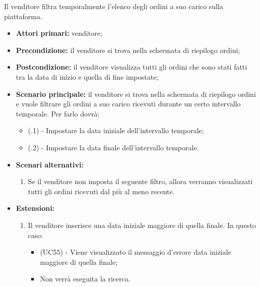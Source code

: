 Il venditore filtra temporalmente l'elenco degli ordini a suo carico sulla piattaforma.
\begin{itemize}
	\item \textbf{Attori primari:} venditore;
	\item \textbf{Precondizione:} il venditore si trova nella schermata di riepilogo ordini;
	\item \textbf{Postcondizione:} il venditore visualizza tutti gli ordini che sono stati fatti tra la data di inizio e quella di fine impostate;
	\item \textbf{Scenario principale:} il venditore si trova nella schermata di riepilogo ordini e vuole filtrare gli ordini a suo carico ricevuti durante un certo intervallo temporale. Per farlo dovrà:
	\begin{itemize}
		\item (\actualSubUC.1) - Impostare la data iniziale dell'intervallo temporale;
		\item (\actualSubUC.2) - Impostare la data finale dell'intervallo temporale.
	\end{itemize}
		\item \textbf{Scenari alternativi:}
	\begin{enumerate}[label=\lett]
		\item Se il venditore non imposta il seguente filtro, allora verranno visualizzati tutti gli ordini ricevuti dal più al meno recente.
	\end{enumerate}
	\item \textbf{Estensioni:}
	\begin{enumerate}[label=\lett]
		\item Il venditore inserisce una data iniziale maggiore di quella finale. In questo caso:
		\begin{itemize}
			\item (UC55) - Viene visualizzato il messaggio d'errore data iniziale maggiore di quella finale;
			\item Non verrà eseguita la ricerca.
		\end{itemize}
	\end{enumerate}
\end{itemize}

